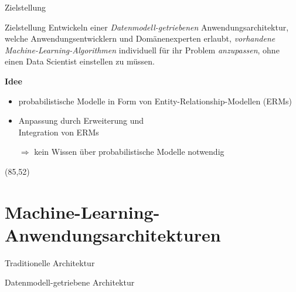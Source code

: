 \documentclass{beamer}
\newcommand{\adjustTikzSize}[0]{\Large}
\newcommand{\tikzScale}[0]{0.55}
\begin{document}
\begin{frame}{Zielstellung}
\begin{block}{Zielstellung}\justifying
	Entwickeln einer \emph{Datenmodell-getriebenen} Anwendungsarchitektur, welche Anwendungsentwicklern und Domänenexperten erlaubt, \emph{vorhandene Machine-Learning-Algorithmen} individuell für ihr Problem \emph{anzupassen}, ohne einen Data Scientist einstellen zu müssen.
\end{block}

\textbf{Idee}
\begin{itemize}
\item probabilistische Modelle in Form von Entity-Relationship-Modellen (ERMs)
\item Anpassung durch Erweiterung und\\ Integration von ERMs
\item[$\Rightarrow$] kein Wissen über probabilistische Modelle notwendig
\end{itemize}

\begin{textblock}{30}(85,52)
	\scalebox{0.25}{\adjustTikzSize }
\end{textblock}
\end{frame}

\section{Machine-Learning-Anwendungsarchitekturen}
\begin{frame}{Traditionelle Architektur}
\scalebox{\tikzScale}{\adjustTikzSize }
\end{frame}

\begin{frame}{Datenmodell-getriebene Architektur}
\scalebox{\tikzScale}{\adjustTikzSize }
\end{frame}
\end{document}
